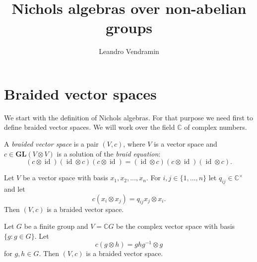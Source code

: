 \documentclass[graybox]{svmult}
\newcommand{\C}{\mathbb{C}}
\newcommand{\id}{\operatorname{id}}
\newcommand{\GL}{\mathbf{GL}}
\begin{document}
\lstset{language=GAP,
  showstringspaces=false,
  xleftmargin=0.0cm,
  xrightmargin=0.0cm,
  basicstyle=\small\ttfamily,
  frame=single,
  framerule=0pt,
}


\title*{Nichols algebras over non-abelian groups}
\author{Leandro Vendramin}



\maketitle


\section{Braided vector spaces}
\label{sec:BVS}

We start with the definition of Nichols algebras. For that purpose we need
first to define braided vector spaces. We will work over the field $\C$ of complex numbers.

\begin{definition}
	A \emph{braided vector space} is a pair $(V,c)$, where $V$ is a vector
	space and $c\in\GL(V\otimes V)$ is a
	solution of the \emph{braid equation}:
	\[
	(c\otimes\id)(\id\otimes c)(c\otimes\id)
	=(\id\otimes c)(c\otimes\id)(\id\otimes c).
	\]
\end{definition}

\begin{example}
	Let $V$ be a vector space with basis $x_{1},x_{2},...,x_{n}$. For $i,j\in\{1,\dots,n\}$ let
	$q_{ij}\in\C^\times$ and 
	let 
	\[
		c(x_{i}\otimes x_{j})=q_{ij}x_{j}\otimes x_{i}.  
	\]
	Then
	$(V,c)$ is a braided vector space.
\end{example}

\begin{example}
	Let $G$ be a finite group and $V=\C G$ be the complex vector space with basis
	$\{g:g\in G\}$. Let \[
		c(g\otimes h)=ghg^{-1}\otimes g
	\]
	for $g,h\in G$.
	Then $(V,c)$ is a braided vector space.
\end{example}
\end{document}
